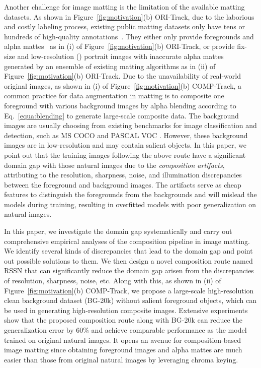 \documentclass[twocolumn]{svjour3}
\begin{document}
Another challenge for image matting is the limitation of the available matting datasets. As shown in Figure~\ref{fig:motivation}(b) ORI-Track, due to the laborious and costly labeling process, existing public matting datasets only have tens or hundreds of high-quality annotations~\citep{rhemann2009perceptually,shen2016deep,xu2017deep,zhang2019late,Qiao_2020_CVPR}. They either only provide foregrounds and alpha mattes~\citep{xu2017deep,Qiao_2020_CVPR} as in (i) of Figure~\ref{fig:motivation}(b) ORI-Track, or provide fix-size and low-resolution () portrait images with inaccurate alpha mattes~\citep{shen2016deep} generated by an ensemble of existing matting algorithms as in (ii) of Figure~\ref{fig:motivation}(b) ORI-Track. Due to the unavailability of real-world original images, as shown in (i) of Figure~\ref{fig:motivation}(b) COMP-Track, a common practice for data augmentation in matting is to composite one foreground with various background images by alpha blending according to Eq.~\eqref{equa:blending} to generate large-scale composite data. The background images are usually choosing from existing benchmarks for image classification and detection, such as MS COCO \citep{lin2014microsoft} and PASCAL VOC \citep{everingham2010pascal}. However, these background images are in low-resolution and may contain salient objects. In this paper, we point out that the training images following the above route have a significant domain gap with those natural images due to the \emph{composition artifacts}, attributing to the resolution, sharpness, noise, and illumination discrepancies between the foreground and background images. The artifacts serve as cheap features to distinguish the foregrounds from the backgrounds and will mislead the models during training, resulting in overfitted models with poor generalization on natural images.


In this paper, we investigate the domain gap systematically and carry out comprehensive empirical analyses of the composition pipeline in image matting. We identify several kinds of discrepancies that lead to the domain gap and point out possible solutions to them. We then design a novel composition route named RSSN that can significantly reduce the domain gap arisen from the discrepancies of resolution, sharpness, noise, etc. Along with this, as shown in (ii) of Figure~\ref{fig:motivation}(b) COMP-Track, we propose a large-scale high-resolution clean background dataset (BG-20k) without salient foreground objects, which can be used in generating high-resolution composite images. Extensive experiments show that the proposed composition route along with BG-20k can reduce the generalization error by 60\% and achieve comparable performance as the model trained on original natural images. It opens an avenue for composition-based image matting since obtaining foreground images and alpha mattes are much easier than those from original natural images by leveraging chroma keying.
\end{document}
